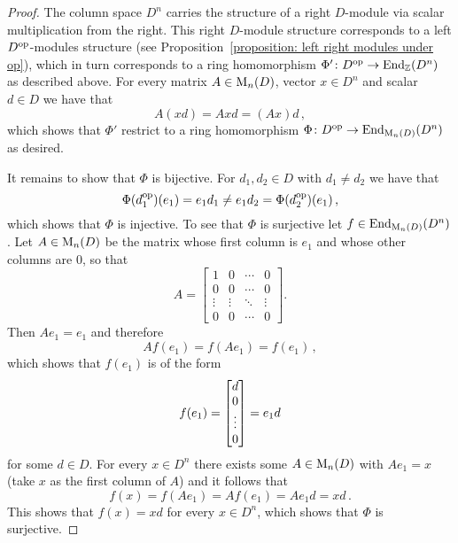 \begin{proof}
  
  The column space $D^n$ carries the structure of a right $D$-module via scalar multiplication from the right.
  This right $D$-module structure corresponds to a left $D^{\operatorname{op}}$-modules structure (see Proposition~\ref{proposition: left right modules under op}), which in turn corresponds to a ring homomorphism $\Phi' \colon D^{\operatorname{op}} \to \operatorname{End}_{\mathbb{Z}}(D^n)$ as described above.
  For every matrix $A \in \operatorname{M}_n(D)$, vector $x \in D^n$ and scalar $d \in D$ we have that
  \[
      A(xd)
    = Axd
    = (Ax)d \,,
  \]
  which shows that $\Phi'$ restrict to a ring homomorphism $\Phi \colon D^{\operatorname{op}} \to \operatorname{End}_{\operatorname{M}_n(D)}(D^n)$ as desired.
  
  It remains to show that $\Phi$ is bijective.
  For $d_1, d_2 \in D$ with $d_1 \neq d_2$ we have that
  \[
          \Phi(d_1^{\operatorname{op}})(e_1)
    =     e_1 d_1
    \neq  e_1 d_2
    =     \Phi(d_2^{\operatorname{op}})(e_1) \,,
  \]
  which shows that $\Phi$ is injective.
  To see that $\Phi$ is surjective let $f \in \operatorname{End}_{\operatorname{M}_n(D)}(D^n)$.
  Let $A \in \operatorname{M}_n(D)$ be the matrix whose first column is $e_1$ and whose other columns are $0$, so that
  \[
      A
    = \begin{bmatrix}
        1       & 0       & \cdots  & 0       \\
        0       & 0       & \cdots  & 0       \\
        \vdots  & \vdots  & \ddots  & \vdots  \\
        0       & 0       & \cdots  & 0
      \end{bmatrix}.
  \]
  Then $A e_1 = e_1$ and therefore
  \[
      A f(e_1)
    = f(A e_1)
    = f(e_1) \,,
  \]
  which shows that $f(e_1)$ is of the form
  \[
      f(e_1)
    = \begin{bmatrix}d \\ 0 \\ \vdots \\ 0\end{bmatrix}
    = e_1 d
  \]
  for some $d \in D$.
  For every $x \in D^n$ there exists some $A \in \operatorname{M}_n(D)$ with $Ae_1 = x$ (take $x$ as the first column of $A$) and it follows that
  \[
      f(x)
    = f(A e_1)
    = A f(e_1)
    = A e_1 d
    = x d \,.
  \]
  This shows that $f(x) = xd$ for every $x \in D^n$, which shows that $\Phi$ is surjective.
\end{proof}


